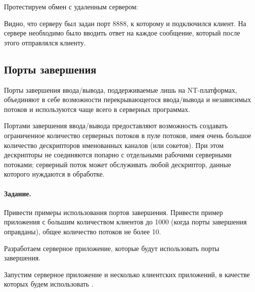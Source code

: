 

Протестируем обмен с удаленным сервером:





Видно, что серверу был задан порт 8888, к которому и подключился клиент. На сервере необходимо было вводить ответ на каждое сообщение, который после этого отправлялся клиенту.

\subsection{Порты завершения}

Порты завершения ввода/вывода, поддерживаемые лишь на NT-платформах, объединяют в себе возможности перекрывающегося ввода/вывода и независимых потоков и используются чаще всего в серверных программах.

Портами завершения ввода/вывода предоставляют возможность создавать ограниченное количество серверных потоков в пуле потоков, имея очень большое количество дескрипторов именованных каналов (или сокетов). При этом дескрипторы не соединяются попарно с отдельными рабочими серверными потоками; серверный поток может обслуживать любой дескриптор, данные которого нуждаются в обработке.

\paragraph{Задание.} Привести примеры использования портов завершения. Привести пример приложения с большим количеством клиентов до 1000 (когда порты завершения оправданы), общее количество потоков не более 10.

Разработаем серверное приложение, которые будут использовать порты завершения.



Запустим серверное приложение  и несколько клиентских приложений, в качестве которых будем использовать .





